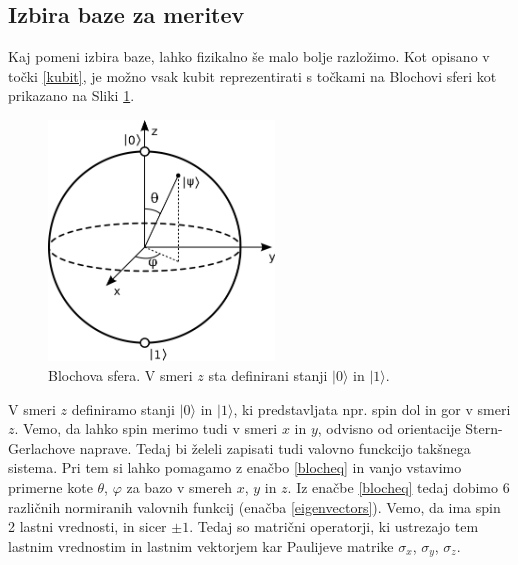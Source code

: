 \documentclass[12pt]{article}
\begin{document}
\subsection{Izbira baze za meritev}

\par Kaj pomeni izbira baze, lahko fizikalno še malo bolje razložimo. Kot opisano v točki \ref{kubit}, je možno vsak kubit reprezentirati s točkami na Blochovi sferi kot prikazano na Sliki \ref{fig:bloch}. 

\begin{figure}[H]
\includegraphics[width=6cm]{bloch.png}
\centering
\caption{Blochova sfera. V smeri $z$ sta definirani stanji $| 0 \rangle$ in $| 1 \rangle$. \cite{BlochSphere2023}}
\label{fig:bloch}
\end{figure}

V smeri $z$ definiramo stanji $| 0 \rangle$ in $| 1 \rangle$, ki predstavljata npr. spin dol in gor v smeri $z$. Vemo, da lahko spin merimo tudi v smeri $x$ in $y$, odvisno od orientacije Stern-Gerlachove naprave. Tedaj bi želeli zapisati tudi valovno funckcijo takšnega sistema. Pri tem si lahko pomagamo z enačbo \ref{blocheq} in vanjo vstavimo primerne kote $\theta$, $\varphi$ za bazo v smereh $x$, $y$ in $z$. Iz enačbe \ref{blocheq} tedaj dobimo 6 različnih normiranih valovnih funkcij (enačba \ref{eigenvectors}). Vemo, da ima spin 2 lastni vrednosti, in sicer $\pm 1$. Tedaj so matrični operatorji, ki ustrezajo tem lastnim vrednostim in lastnim vektorjem kar Paulijeve matrike $\sigma_x$, $\sigma_y$, $\sigma_z$. \cite{PauliMatrices2023}
\end{document}
